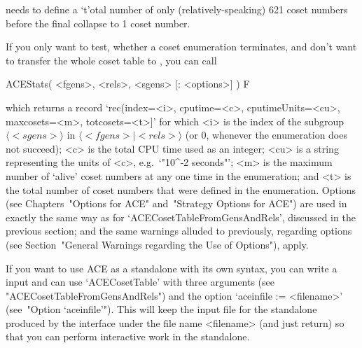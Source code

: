 {\ACE} needs to define a `t'otal number of only  (relatively-speaking)
621 coset numbers before the final collapse to 1 coset number.

\enditems


\beginitems

If you only want to  test, whether a coset enumeration terminates, and
don't want to  transfer the whole coset table  to {\GAP}, you can call

\>ACEStats( <fgens>, <rels>, <sgens> [: <options>] ) F

which returns a record `rec(index=<i>, cputime=<c>, cputimeUnits=<cu>,
maxcosets=<m>, totcosets=<t>]' for which  <i>  is  the  index  of  the
subgroup $\langle <sgens> \rangle$ in  $\langle  <fgens>  \mid  <rels>
\rangle$ (or $0$, whenever the enumeration does not succeed);  <c>  is
the total CPU time used as an integer; <cu> is a  string  representing
the units of <c>, e.g.~`"10^-2 seconds"'; <m> is the maximum number of
\lq{}alive' coset numbers at any one time in the enumeration; and  <t>
is the total  number  of  coset  numbers  that  were  defined  in  the
enumeration. Options (see  Chapters~"Options  for  ACE"  and~"Strategy
Options  for  ACE")  are  used  in  exactly  the  same  way   as   for
`ACECosetTableFromGensAndRels',  discussed in  the  previous  section;
and the same warnings alluded to previously,  regarding  options  (see
Section~"General Warnings regarding the Use of Options"), apply.

\enditems


If you want to use ACE as a standalone with its own  syntax,  you  can
write a {\GAP} input and can use `ACECosetTable' with three  arguments
(see "ACECosetTableFromGensAndRels")  and  the  option  `aceinfile  :=
<filename>' (see~"Option `aceinfile'"). This will keep the input  file
for the {\ACE} standalone produced by the {\GAP} interface  under  the
file name <filename>  (and  just  return)  so  that  you  can  perform
interactive work in the standalone.


\beginitems

